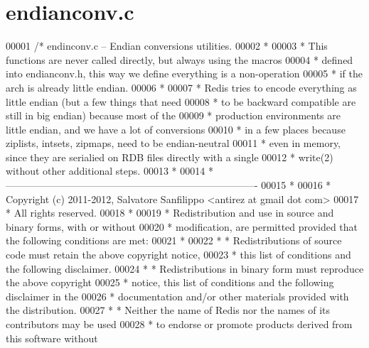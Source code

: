 \hypertarget{endianconv_8c_source}{}\section{endianconv.\+c}
\label{endianconv_8c_source}

\begin{DoxyCode}
00001 \textcolor{comment}{/* endinconv.c -- Endian conversions utilities.}
00002 \textcolor{comment}{ *}
00003 \textcolor{comment}{ * This functions are never called directly, but always using the macros}
00004 \textcolor{comment}{ * defined into endianconv.h, this way we define everything is a non-operation}
00005 \textcolor{comment}{ * if the arch is already little endian.}
00006 \textcolor{comment}{ *}
00007 \textcolor{comment}{ * Redis tries to encode everything as little endian (but a few things that need}
00008 \textcolor{comment}{ * to be backward compatible are still in big endian) because most of the}
00009 \textcolor{comment}{ * production environments are little endian, and we have a lot of conversions}
00010 \textcolor{comment}{ * in a few places because ziplists, intsets, zipmaps, need to be endian-neutral}
00011 \textcolor{comment}{ * even in memory, since they are serialied on RDB files directly with a single}
00012 \textcolor{comment}{ * write(2) without other additional steps.}
00013 \textcolor{comment}{ *}
00014 \textcolor{comment}{ * ----------------------------------------------------------------------------}
00015 \textcolor{comment}{ *}
00016 \textcolor{comment}{ * Copyright (c) 2011-2012, Salvatore Sanfilippo <antirez at gmail dot com>}
00017 \textcolor{comment}{ * All rights reserved.}
00018 \textcolor{comment}{ *}
00019 \textcolor{comment}{ * Redistribution and use in source and binary forms, with or without}
00020 \textcolor{comment}{ * modification, are permitted provided that the following conditions are met:}
00021 \textcolor{comment}{ *}
00022 \textcolor{comment}{ *   * Redistributions of source code must retain the above copyright notice,}
00023 \textcolor{comment}{ *     this list of conditions and the following disclaimer.}
00024 \textcolor{comment}{ *   * Redistributions in binary form must reproduce the above copyright}
00025 \textcolor{comment}{ *     notice, this list of conditions and the following disclaimer in the}
00026 \textcolor{comment}{ *     documentation and/or other materials provided with the distribution.}
00027 \textcolor{comment}{ *   * Neither the name of Redis nor the names of its contributors may be used}
00028 \textcolor{comment}{ *     to endorse or promote products derived from this software without}

\end{DoxyCode}

